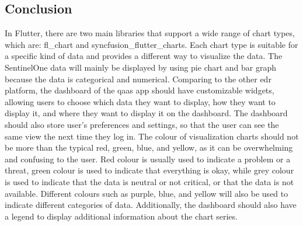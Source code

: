 \begin{multicols}{2}
      \subsection{Conclusion}
      In Flutter, there are two main libraries that support a wide range of chart types, which are: fl\_chart and
      syncfusion\_flutter\_charts. Each chart type is suitable for a specific kind of data and provides a different
      way to visualize the data. The SentinelOne data will mainly be displayed by using pie chart and bar graph
      because the data is categorical and numerical. Comparing to the other \acrshort{edr} platform, the dashboard
      of the \acrshort{qaas} app should have customizable widgets, allowing users to choose which data they want
      to display, how they want to display it, and where they want to display it on the dashboard. The dashboard
      should also store user's preferences and settings, so that the user can see the same view the next time they
      log in. The colour of visualization charts should not be more than the typical red, green, blue, and yellow,
      as it can be overwhelming and confusing to the user. Red colour is usually used to indicate a problem or a
      threat,  green colour is used to indicate that everything is okay, while grey colour is used to indicate that
      the data is neutral or not critical, or that the data is not available. Different colours such as purple,
      blue, and yellow will also be used to indicate different categories of data. Additionally, the dashboard
      should also have a legend to display additional information about the chart series.
\end{multicols}